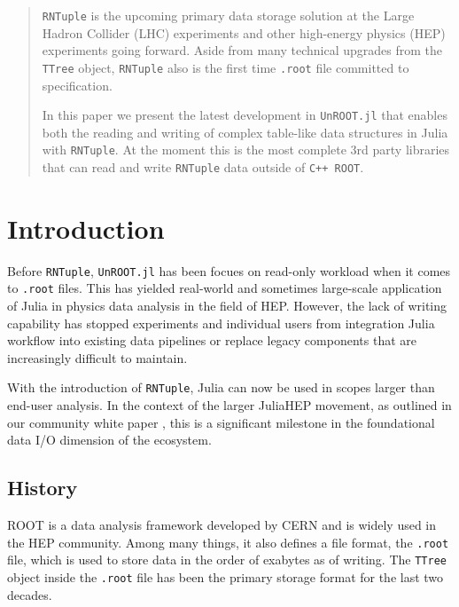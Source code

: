 \documentclass{juliacon}
\begin{document}


\maketitle

\begin{abstract}
    \verb|RNTuple| is the upcoming primary data storage solution at the Large Hadron Collider (LHC)
    experiments and other high-energy physics (HEP) experiments going forward. Aside from many
    technical upgrades from the \verb|TTree| object, \verb|RNTuple| also is the first time
    \verb|.root| file committed to specification.\cite{rntuple_2023}

    In this paper we present the latest
    development in \verb|UnROOT.jl| that enables both the reading and writing of complex
    table-like data structures in Julia with \verb|RNTuple|. At the moment this is the most complete
    3rd party libraries that can read and write \verb|RNTuple| data outside of \verb|C++ ROOT|.

\end{abstract}

\section{Introduction}
Before \verb|RNTuple|, \verb|UnROOT.jl| has been focues on read-only workload when it comes to
\verb|.root| files.\cite{unroot_2022} This has yielded real-world and sometimes large-scale
application of Julia in physics data analysis in the field of HEP. However, the lack of writing
capability has stopped experiments and individual users from integration Julia workflow into
existing data pipelines or replace legacy components that are increasingly difficult to maintain.

With the introduction of \verb|RNTuple|, Julia can now be used in scopes larger than end-user
analysis. In the context of the larger JuliaHEP movement, as outlined in our community white paper
\cite{juliahep_whitepaper}, this is a significant milestone in the foundational data I/O dimension
of the ecosystem.

\subsection{History}
ROOT is a data analysis framework developed by CERN and is widely used in the HEP community. Among
many things, it also defines a file format, the \verb|.root| file, which is used to store data in
the order of exabytes as of writing. The \verb|TTree| object inside the \verb|.root| file has been
the primary storage format for the last two decades.
\end{document}
